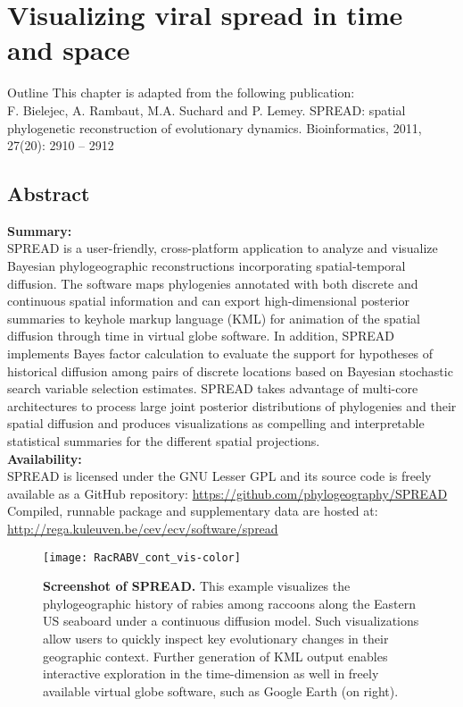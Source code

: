 \chapter{Visualizing viral spread in time and space\label{chap:spread}}

\begin{remark}{Outline}
This chapter is adapted from the following publication: \\
F. Bielejec, A. Rambaut, M.A. Suchard and P. Lemey.
SPREAD: spatial phylogenetic reconstruction of evolutionary dynamics.
Bioinformatics, 2011, 27(20): 2910 -- 2912
\end{remark}

\section{Abstract}

\textbf{Summary:}\\
SPREAD is a user-friendly, cross-platform application to analyze and visualize Bayesian phylogeographic reconstructions incorporating spatial-temporal diffusion.
The software maps phylogenies annotated with both discrete and continuous spatial information and can export high-dimensional posterior summaries to keyhole markup language (KML) for animation of the spatial diffusion through time in virtual globe software.
In addition, SPREAD implements Bayes factor calculation to evaluate the support for hypotheses of historical diffusion among pairs of discrete locations based on Bayesian stochastic search variable selection estimates.
SPREAD takes advantage of multi-core architectures to process large joint posterior distributions of phylogenies and their spatial diffusion and produces visualizations as compelling and interpretable statistical summaries for the different spatial projections.\\

\noindent
\textbf{Availability:} \\
SPREAD is licensed under the GNU Lesser GPL and its source code is freely available as a GitHub repository: \url{https://github.com/phylogeography/SPREAD} 
Compiled, runnable package and supplementary data are hosted at: \url{http://rega.kuleuven.be/cev/ecv/software/spread} 

\begin{figure}[h!]
\centering
\texttt{[image: RacRABV\_cont\_vis-color]}
\caption{
{ \footnotesize 
{\bf Screenshot of SPREAD.}
This example visualizes the phylogeographic history of rabies among raccoons along the Eastern US seaboard under a continuous diffusion model.  Such visualizations allow users to quickly inspect key evolutionary changes in their geographic context.  Further generation of KML output enables interactive exploration in the time-dimension as well in freely available virtual globe software, such as {\sc Google Earth} (on right).
}%
}
\label{fig:screenshot01}
\end{figure}

